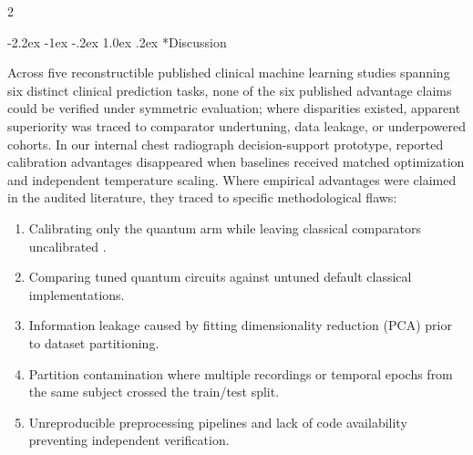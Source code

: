 \documentclass[10pt,a4paper,twoside]{article}
\makeatletter
\renewcommand{\section}{\@startsection{section}{1}{\z@}%
  {-2.2ex \@plus -1ex \@minus -.2ex}%
  {1.0ex \@plus.2ex}%
  {\normalfont\large\sffamily\bfseries\color{naturedark}}}
\makeatother
\begin{document}
\begin{multicols}{2}

\section*{Discussion}

Across five reconstructible published clinical machine learning studies spanning six distinct clinical prediction tasks, none of the six published advantage claims could be verified under symmetric evaluation; where disparities existed, apparent superiority was traced to comparator undertuning, data leakage, or underpowered cohorts. In our internal chest radiograph decision-support prototype, reported calibration advantages disappeared when baselines received matched optimization and independent temperature scaling. Where empirical advantages were claimed in the audited literature, they traced to specific methodological flaws:
\begin{enumerate}
  \setlength{\itemsep}{1pt}
  \setlength{\parskip}{0pt}
  \item Calibrating only the quantum arm while leaving classical comparators uncalibrated \cite{guo2017}.
  \item Comparing tuned quantum circuits against untuned default classical implementations.
  \item Information leakage caused by fitting dimensionality reduction (PCA) prior to dataset partitioning.
  \item Partition contamination where multiple recordings or temporal epochs from the same subject crossed the train/test split.
  \item Unreproducible preprocessing pipelines and lack of code availability preventing independent verification.
\end{enumerate}


\end{multicols}
\end{document}
